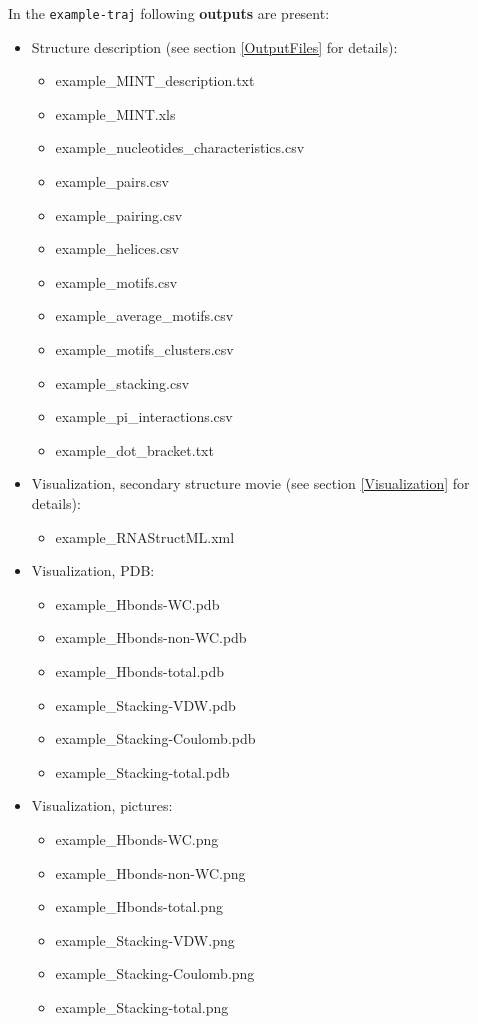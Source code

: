 \documentclass[12pt]{article}
\begin{document}
In the  {\tt example-traj} following \textbf{outputs} are present:
\begin{itemize}
\item Structure description (see section \ref{OutputFiles} for details):
\begin{itemize}
\item  example\_MINT\_description.txt	
\item example\_MINT.xls
\item example\_nucleotides\_characteristics.csv
\item example\_pairs.csv
\item example\_pairing.csv
\item example\_helices.csv
\item example\_motifs.csv
\item example\_average\_motifs.csv				
\item example\_motifs\_clusters.csv
\item example\_stacking.csv
\item example\_pi\_interactions.csv
\item example\_dot\_bracket.txt
\end{itemize}
\item Visualization, secondary structure movie  (see section \ref{Visualization} for details):
\begin{itemize}
\item example\_RNAStructML.xml
\end{itemize}
\item Visualization, PDB:
\begin{itemize}
\item example\_Hbonds-WC.pdb				
\item example\_Hbonds-non-WC.pdb				 
\item example\_Hbonds-total.pdb				 
\item example\_Stacking-VDW.pdb				
\item example\_Stacking-Coulomb.pdb
\item example\_Stacking-total.pdb
\end{itemize}
\item Visualization, pictures:
\begin{itemize}
\item example\_Hbonds-WC.png				
\item example\_Hbonds-non-WC.png
\item example\_Hbonds-total.png		 
\item example\_Stacking-VDW.png				
\item example\_Stacking-Coulomb.png
\item example\_Stacking-total.png
\end{itemize}
\end{itemize}
\end{document}

